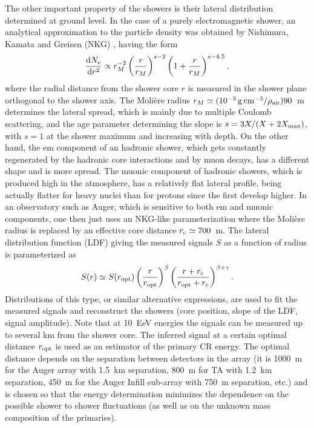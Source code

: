 \documentclass[twoside,12pt]{article}
\newcommand{\be}{\begin{equation}}
\newcommand{\ee}{\end{equation}}
\begin{document}
The other important property of the showers is their lateral distribution determined at ground level. In the case of a purely electromagnetic shower, an analytical approximation to the particle density was obtained by Nishimura, Kamata and Greisen (NKG)  \cite{nk,greisen}, having the form
\be 
\frac{{\rm d}N_e}{{\rm d}r^2}\propto r_M^{-2}\left(\frac{r}{r_M}\right)^{s-2}\left(1+\frac{r}{r_M}\right)^{s-4.5},
\ee
where the radial distance from the shower core $r$ is measured in the shower plane orthogonal to the shower axis. The Moli\`ere radius $r_M\simeq (10^{-3}\,{\rm g\,cm}^{-3}/\rho_{\rm air})90$~m determines the lateral spread, which is mainly due to multiple Coulomb scattering, and the age parameter determining the slope is $s=3X/(X+2X_{\rm max})$, with $s=1$ at the shower maximum and increasing with depth. 
On the other hand, the em component of an hadronic shower, which gets constantly regenerated by the hadronic core interactions and by muon decays, has a  different shape and is more spread. The muonic component of hadronic showers, which is produced high in the atmosphere, has a relatively flat lateral profile, being actually flatter for heavy nuclei than for protons since the first develop higher. In an observatory such as Auger, which is sensitive to both em and muonic components, one then just uses an  NKG-like parameterization where the Moli\`ere radius is replaced by an effective core distance $r_{\rm c}\simeq 700$~m. The lateral distribution function (LDF) giving the measured signals $S$ as a function of radius  is parameterized as
\be
S(r)\simeq S(r_{\rm opt})\left(\frac{r}{r_{\rm opt}}\right)^\beta \left(\frac{r+r_{\rm c}}{r_{\rm opt}+r_{\rm c}}\right)^{\beta+\gamma} .
\ee
Distributions of this type, or similar alternative expressions, are used to fit the measured signals and reconstruct the showers (core position, slope of the LDF, signal amplitude). Note that at 10~EeV energies the signals can be measured up to several km from the shower core. The inferred signal at a certain optimal distance $r_{\rm opt}$ is used as an estimator of the primary CR energy. The optimal distance depends on the  separation between detectors in the array  (it is 1000~m for the Auger array with 1.5~km separation, 800~m for TA with 1.2~km separation, 450~m for the Auger Infill sub-array with 750~m separation, etc.) and is chosen so that the energy determination minimizes the dependence on the  possible shower to shower fluctuations (as well as on the unknown mass composition of the primaries). 
\end{document}
